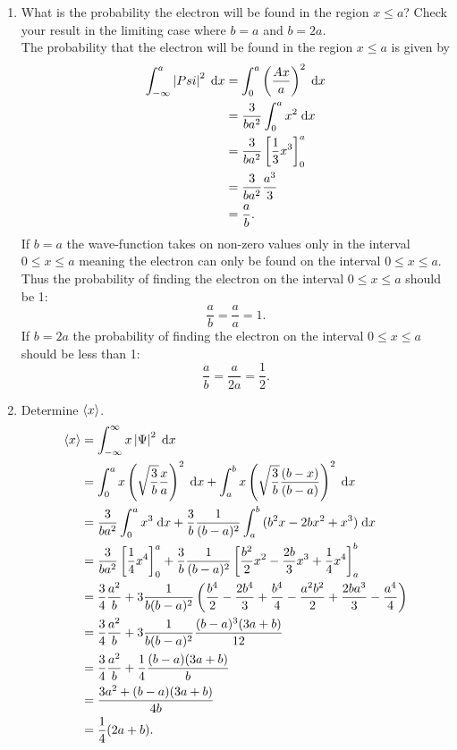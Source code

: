\documentclass[a4paper, 12pt]{config/homework}
\begin{document}
\begin{enumerate}
\begin{enumerate}[label=(\alph*)]
\item What is the probability the electron will be found in the region \(x \le a\)? Check your result in the limiting case where \(b=a\) and \(b=2a\).
\\The probability that the electron will be found in the region \(x \le a\) is given by
\begin{align*}
\bint{-\infty}{a}{\left|Psi\right|^2}{x} &= \bint{0}{a}{\left(\frac{Ax}{a}\right)^2}{x}
\\&= \frac{3}{ba^2}\bint{0}{a}{x^2}{x}
\\&= \frac{3}{ba^2}\left[\frac{1}{3}x^3\right]_0^a
\\&= \frac{3}{ba^2} \frac{a^3}{3}
\\&= \frac{a}{b}.
\end{align*}
If \(b=a\) the wave-function takes on non-zero values only in the interval \\ \(0 \le x \le a\) meaning the electron can only be found on the interval \(0 \le x \le a\). Thus the probability of finding the electron on the interval \(0 \le x \le a\) should be 1:
\[\frac{a}{b} = \frac{a}{a} = 1.\]
If \(b=2a\) the probability of finding the electron on the interval \(0 \le x \le a\) should be less than 1:
\[\frac{a}{b} = \frac{a}{2a} = \frac{1}{2}.\]

\item Determine \(\braket{x}\).
\begin{align*}
\braket{x} &= \bint{-\infty}{\infty}{x\left| \Psi \right|^2}{x}
\\&= \bint{0}{a}{x\left(\sqrt{\frac{3}{b}} \frac{x}{a}\right)^2}{x} + \bint{a}{b}{x\left(\sqrt{\frac{3}{b}}\frac{(b-x)}{(b-a)}\right)^2}{x}
\\&= \frac{3}{ba^2}\bint{0}{a}{x^3}{x} + \frac{3}{b}\frac{1}{(b-a)^2}\bint{a}{b}{(b^2 x - 2bx^2 + x^3)}{x}
\\&= \frac{3}{ba^2}\left[\frac{1}{4}x^4\right]_0^a + \frac{3}{b}\frac{1}{(b-a)^2} \left[\frac{b^2}{2}x^2 - \frac{2b}{3}x^3 + \frac{1}{4}x^4\right]_a^b
\\&= \frac{3}{4}\frac{a^2}{b} + 3 \frac{1}{b(b-a)^2}\left(\frac{b^4}{2} - \frac{2b^4}{3} + \frac{b^4}{4} - \frac{a^2 b^2}{2} + \frac{2ba^3}{3} - \frac{a^4}{4}\right)
\\&= \frac{3}{4} \frac{a^2}{b} + 3 \frac{1}{b(b-a)^2}\frac{(b-a)^3(3a+b)}{12}
\\&= \frac{3}{4} \frac{a^2}{b} + \frac{1}{4} \frac{(b-a)(3a+b)}{b}
\\&= \frac{3a^2 + (b-a)(3a+b)}{4b}
\\&= \frac{1}{4} (2a+b).
\end{align*}

\end{enumerate}
\end{enumerate}
\end{document}
